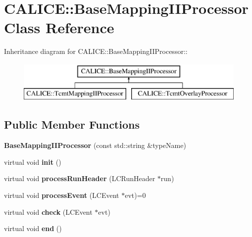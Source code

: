 \section{CALICE::BaseMappingIIProcessor Class Reference}
\label{classCALICE_1_1BaseMappingIIProcessor}
Inheritance diagram for CALICE::BaseMappingIIProcessor::\begin{figure}[H]
\begin{center}
\leavevmode
\includegraphics[height=2cm]{classCALICE_1_1BaseMappingIIProcessor}
\end{center}
\end{figure}
\subsection*{Public Member Functions}
\begin{DoxyCompactItemize}
\item 
{\bfseries BaseMappingIIProcessor} (const std::string \&typeName)\label{classCALICE_1_1BaseMappingIIProcessor_a8fe56d91380e26a12371e14a323d25d6}

\item 
virtual void {\bfseries init} ()\label{classCALICE_1_1BaseMappingIIProcessor_abb1ef572435bcc64898506d8f4c96cd9}

\item 
virtual void {\bfseries processRunHeader} (LCRunHeader $\ast$run)\label{classCALICE_1_1BaseMappingIIProcessor_a995afff29900be06e93ebe0453ed4aa6}

\item 
virtual void {\bfseries processEvent} (LCEvent $\ast$evt)=0\label{classCALICE_1_1BaseMappingIIProcessor_a5ac01e2e7f361f7ec4e1bd039ccbd33b}

\item 
virtual void {\bfseries check} (LCEvent $\ast$evt)\label{classCALICE_1_1BaseMappingIIProcessor_a4abb713a96256ee6599e9737e54bdfe1}

\item 
virtual void {\bfseries end} ()\label{classCALICE_1_1BaseMappingIIProcessor_a201450aeeedac3600901e6fd1d25ada6}

\end{DoxyCompactItemize}
